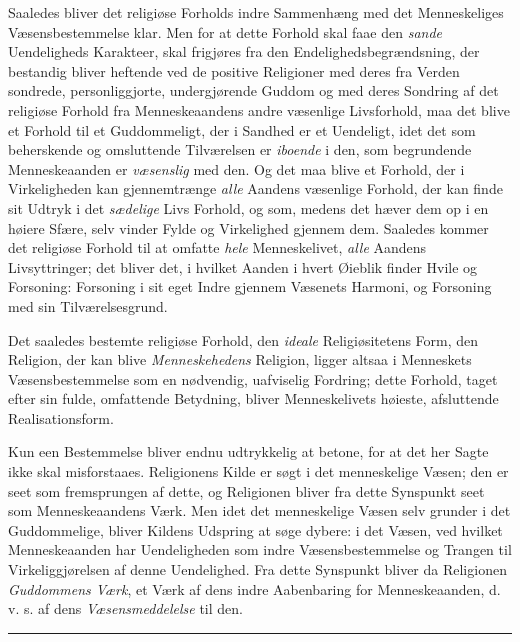 \documentclass[12pt,a4paper,openany]{book}
\newcommand{\opage}[1]{\marginnote{\footnotesize\textit{[#1]}}}
\begin{document}
Saaledes bliver det religiøse Forholds indre Sammenhæng
med det Menneskeliges Væsensbestemmelse klar. Men
for at dette Forhold skal faae den \emph{sande} Uendeligheds Karakteer,
skal frigjøres fra den Endelighedsbegrændsning, der bestandig
bliver heftende ved de positive Religioner med deres fra Verden
sondrede, personliggjorte, undergjørende Guddom og med
deres Sondring af det religiøse Forhold fra Menneskeaandens
andre væsenlige Livsforhold, maa det blive et Forhold til et
Guddommeligt, der i Sandhed er et Uendeligt, idet det som
beherskende og omsluttende Tilværelsen er \emph{iboende} i den,
som begrundende Menneskeaanden er \emph{væsenslig} med den. Og
det maa blive et Forhold, der i Virkeligheden kan gjennemtrænge
\emph{alle} Aandens væsenlige Forhold, der kan finde sit
Udtryk i det \emph{sædelige} Livs Forhold, og som, medens det hæver
dem op i en høiere Sfære, selv vinder Fylde og Virkelighed
\opage{500}gjennem dem. Saaledes kommer det religiøse Forhold til at
omfatte \emph{hele} Menneskelivet, \emph{alle} Aandens Livsyttringer; det
bliver det, i hvilket Aanden i hvert Øieblik finder Hvile og
Forsoning: Forsoning i sit eget Indre gjennem Væsenets
Harmoni, og Forsoning med sin Tilværelsesgrund.

Det saaledes bestemte religiøse Forhold, den \emph{ideale}
Religiøsitetens Form, den Religion, der kan blive \emph{Menneskehedens}
Religion, ligger altsaa i Menneskets Væsensbestemmelse
som en nødvendig, uafviselig Fordring; dette Forhold, taget
efter sin fulde, omfattende Betydning, bliver Menneskelivets
høieste, afsluttende Realisationsform.

Kun een Bestemmelse bliver endnu udtrykkelig at betone,
for at det her Sagte ikke skal misforstaaes. Religionens
Kilde er søgt i det menneskelige Væsen; den er seet som fremsprungen
af dette, og Religionen bliver fra dette Synspunkt seet
som Menneskeaandens Værk. Men idet det menneskelige Væsen
selv grunder i det Guddommelige, bliver Kildens Udspring
at søge dybere: i det Væsen, ved hvilket Menneskeaanden har
Uendeligheden som indre Væsensbestemmelse og Trangen til
Virkeliggjørelsen af denne Uendelighed. Fra dette Synspunkt
bliver da Religionen \emph{Guddommens Værk}, et Værk af
dens indre Aabenbaring for Menneskeaanden, d. v. s. af
dens \emph{Væsensmeddelelse} til den.

\begin{center}\rule{1.8cm}{0.4pt}\end{center}
\end{document}

